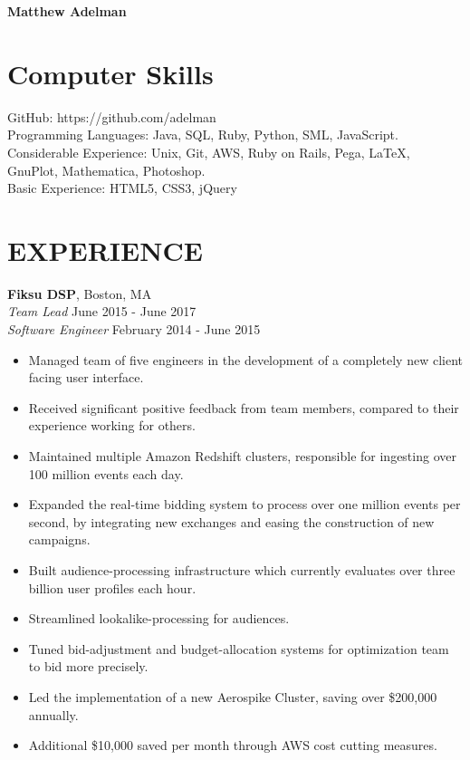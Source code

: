 \documentclass[11pt]{res} %
\begin{document}
{\bf\Large Matthew Adelman}

\address{2394 Williams Street $\bullet$ Palo Alto, CA 94306 \\
        (201) 323-2719 $\bullet$ mxadelman@gmail.com}

\address{}

\begin{resume}

\section{Computer Skills}
GitHub: https://github.com/adelman\\
Programming Languages: Java, SQL, Ruby, Python, SML, JavaScript.\\
Considerable Experience: Unix, Git, AWS, Ruby on Rails, Pega, \LaTeX, GnuPlot,
Mathematica, Photoshop.\\
Basic Experience: HTML5, CSS3, jQuery

\section{EXPERIENCE}
{\bf Fiksu DSP}, Boston, MA\\
{\it Team Lead} \hfill June 2015 - June 2017 \\
{\it Software Engineer} \hfill February 2014 - June 2015\!

\vspace{0.01in} %
   \begin{itemize} \itemsep -2pt  %
   \item Managed team of five engineers in the development of a completely new
     client facing user interface.
   \item Received significant positive feedback from team members, compared to
     their experience working for others.
   \item Maintained multiple Amazon Redshift clusters, responsible for ingesting
     over 100 million events each day.
   \item Expanded the real-time bidding system to process over one million
     events per second, by integrating new exchanges and easing the construction
     of new campaigns.
   \item Built audience-processing infrastructure which
     currently evaluates over three billion user profiles each hour.
   \item Streamlined lookalike-processing for audiences.
   \item Tuned bid-adjustment and budget-allocation systems for
     optimization team to bid more precisely.
   \item Led the implementation of a new Aerospike Cluster, saving over
     \$200,000 annually.
   \item Additional \$10,000 saved per month through AWS cost cutting measures.
   \end{itemize}


\end{resume}
\end{document}
